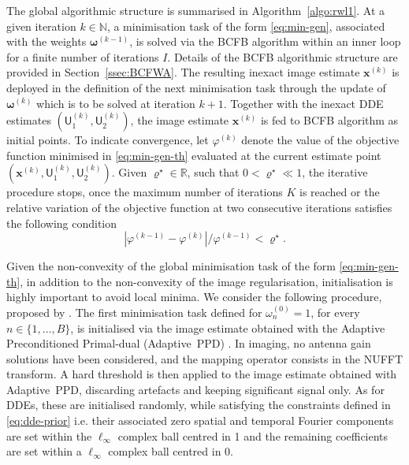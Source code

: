 \documentclass[fleqn,usenatbib]{mnras}
\newcommand{\xb}{\ensuremath{\boldsymbol{x}}}
\newcommand{\Ub}{\ensuremath{\boldsymbol{\mathsf{U}}}}
\newcommand{\eN}{\mathbb{N}}
\newcommand{\eR}{\mathbb{R}}
\begin{document}
The global algorithmic structure is summarised in Algorithm~\ref{algo:rwl1}. At a given iteration $k\in \eN$, a minimisation task of the form \eqref{eq:min-gen}, associated with the weights {$\boldsymbol{\omega}^{(k-1)}$}, is solved via the BCFB algorithm within an inner loop for a finite number of iterations $I$. Details of the BCFB algorithmic structure are provided in Section~\ref{ssec:BCFWA}. 
The resulting inexact image estimate $\xb^{(k)}$ is deployed in the definition of the next minimisation task through the update of {$\boldsymbol{\omega}^{(k)}$} which is to be solved at iteration $k+1$. Together with the inexact DDE estimates $\left( \Ub_1^{(k)},\Ub_2^{(k)}\right)$, the image estimate $\xb^{(k)}$ is fed to BCFB algorithm as initial points. To indicate convergence, let ${\varphi}^{(k)}$ denote the value of the objective function{{ minimised in \eqref{eq:min-gen-th}}}  evaluated at the current estimate point $\left(\xb^{(k)},\Ub_1^{(k)},\Ub_2^{(k)}\right)$. Given ${\varrho}^\star\in \eR$, such that $ 0< \varrho^\star \ll 1$, the iterative procedure stops, once the maximum number of iterations $K$ is reached or the relative variation  {{of the objective function at two consecutive iterations}} satisfies the following condition
\begin{equation}
 {|{\varphi}^{(k-1)} -{\varphi}^{(k)}|}/ {{\varphi}^{(k-1)}} < {\varrho}^\star.
 \end{equation} 

Given the non-convexity of the global minimisation task of the form \eqref{eq:min-gen-th}, {in addition to the non-convexity of the image regularisation}, initialisation is highly important to avoid local minima. {We consider the following procedure, proposed by \citet{Repetti20172}}. The first minimisation task defined for ${\omega}_n^{(0)}=1$, for every $n\in\{1,\dots,B\}$, is initialised via the image estimate obtained with the Adaptive Preconditioned Primal-dual ({Adaptive~PPD}) \citep{Dabbech2018}. In imaging, no antenna gain solutions have been considered, and the mapping operator consists in the NUFFT transform. A hard threshold is then applied to the image estimate obtained with {Adaptive~PPD}, discarding artefacts and keeping significant signal only. As for DDEs, these are initialised randomly, while satisfying the constraints defined in \eqref{eq:dde-prior} i.e. their associated zero spatial and temporal Fourier components are set within the $\ell_\infty$ complex ball centred in 1 and the remaining coefficients are set within a $\ell_\infty$ complex ball centred in 0. 
\end{document}
